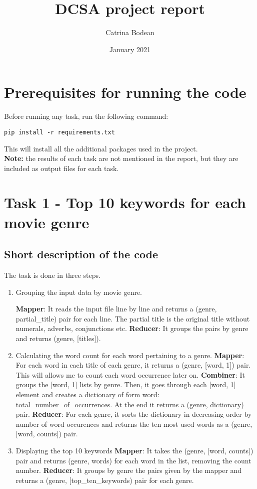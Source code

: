 \documentclass[12pt, a4paper]{article}
\author{Catrina Bodean}
\title{DCSA project report}
\date{January 2021}
\begin{document}
\maketitle

\section{Prerequisites for running the code}
Before running any task, run the following command:\\

\centerline{\texttt{pip install -r requirements.txt}}

\hfill 

\noindent
This will install all the additional packages used in the project.\\

\noindent
\textbf{Note:} the results of each task are not mentioned in the report, but they are included as output files for each task.

\section{Task 1 - Top 10 keywords for each movie genre}
\subsection{Short description of the code}
The task is done in three steps.

\begin{enumerate}[label=\textbf{Step \arabic*.}, wide=0pt, leftmargin=2em]
\item Grouping the input data by movie genre.

	\subitem \textbf{Mapper}: It reads the input file line by line and returns a (genre, partial\_title) pair for each line. The partial title is the original title without numerals, adverbs, conjunctions etc.
	\subitem \textbf{Reducer}: It groups the pairs by genre and returns (genre, [titles]).
\item Calculating the word count for each word pertaining to a genre.
	\subitem \textbf{Mapper}: For each word in each title of each genre, it returns a (genre, [word, 1]) pair. This will allows me to count each word occurrence later on.
	\subitem \textbf{Combiner}: It groups the [word, 1] lists by genre. Then, it goes through each [word, 1] element and creates a dictionary of form {word: total\_number\_of\_occurrences}. At the end it returns a (genre, dictionary) pair.
	\subitem \textbf{Reducer}: For each genre, it sorts the dictionary in decreasing order by number of word occurences and returns the ten most used words as a (genre, [word, counts]) pair.
\item Displaying the top 10 keywords
	\subitem \textbf{Mapper}: It takes the (genre, [word, counts]) pair and returns (genre, words) for each word in the list, removing the count number.
	\subitem \textbf{Reducer}: It groups by genre the pairs given by the mapper and returns a (genre, [top\_ten\_keywords) pair for each genre.
\end{enumerate}
\end{document}
